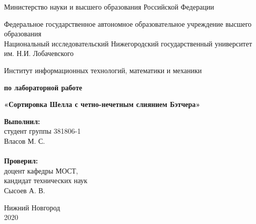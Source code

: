 \documentclass{report}
\begin{document}
\begin{titlepage}

\begin{center}
Министерство науки и высшего образования Российской Федерации
\end{center}

\begin{center}
Федеральное государственное автономное образовательное учреждение высшего образования \\
Национальный исследовательский Нижегородский государственный университет им. Н.И. Лобачевского
\end{center}

\begin{center}
Институт информационных технологий, математики и механики
\end{center}

\vspace{4em}

\begin{center}
\textbf{ по лабораторной работе} \\
\end{center}
\begin{center}
\textbf{\Large«Сортировка Шелла с четно-нечетным слиянием Бэтчера»} \\
\end{center}

\vspace{4em}

\newbox{\lbox}
\newlength{\maxl}
\setlength{\maxl}{\wd\lbox}
\hfill\parbox{7cm}{
\hspace*{5cm}\hspace*{-5cm}\textbf{Выполнил:} \\ студент группы 381806-1 \\ Власов М. С.\\
\\
\hspace*{5cm}\hspace*{-5cm}\textbf{Проверил:}\\ доцент кафедры МОСТ, \\ кандидат технических наук \\ Сысоев А. В.\\
}
\vspace{\fill}

\begin{center} Нижний Новгород \\ 2020 \end{center}

\end{titlepage}
\end{document}
